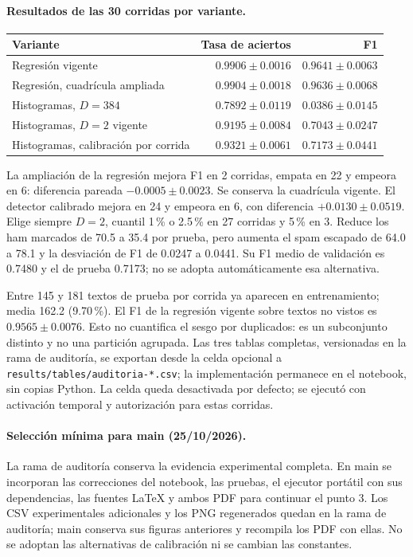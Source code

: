 \documentclass[11pt,letterpaper]{article}
\renewcommand{\_}{\originalunderscore\allowbreak}
\begin{document}
\paragraph{Resultados de las 30 corridas por variante.}
\begin{center}
\begin{tabular}{lrr}
\toprule
Variante & Tasa de aciertos & F1\\
\midrule
Regresión vigente & $0.9906\pm0.0016$ & $0.9641\pm0.0063$\\
Regresión, cuadrícula ampliada & $0.9904\pm0.0018$ & $0.9636\pm0.0068$\\
Histogramas, $D=384$ & $0.7892\pm0.0119$ & $0.0386\pm0.0145$\\
Histogramas, $D=2$ vigente & $0.9195\pm0.0084$ & $0.7043\pm0.0247$\\
Histogramas, calibración por corrida & $0.9321\pm0.0061$ & $0.7173\pm0.0441$\\
\bottomrule
\end{tabular}
\end{center}
La ampliación de la regresión mejora F1 en 2 corridas, empata en 22 y
empeora en 6: diferencia pareada $-0.0005\pm0.0023$. Se conserva la
cuadrícula vigente. El detector calibrado mejora en 24 y empeora en 6,
con diferencia $+0.0130\pm0.0519$. Elige siempre $D=2$, cuantil 1\,\% o
2.5\,\% en 27 corridas y 5\,\% en 3. Reduce los ham marcados de 70.5 a
35.4 por prueba, pero aumenta el spam escapado de 64.0 a 78.1 y la desviación
de F1 de 0.0247 a 0.0441. Su F1 medio de validación es 0.7480 y el de
prueba 0.7173; no se adopta automáticamente esa alternativa.

Entre 145 y 181 textos de prueba por corrida ya aparecen en entrenamiento;
media 162.2 (9.70\,\%). El F1 de la regresión vigente sobre textos no
vistos es $0.9565\pm0.0076$. Esto no cuantifica el sesgo por duplicados:
es un subconjunto distinto y no una partición agrupada.
Las tres tablas completas, versionadas en la rama de auditoría, se
exportan desde la celda opcional a \texttt{results/tables/auditoria-*.csv}; la implementación permanece en
el notebook, sin copias Python. La celda queda desactivada por defecto;
se ejecutó con activación temporal y autorización para estas corridas.

\paragraph{Selección mínima para main (25/10/2026).}
La rama de auditoría conserva la evidencia experimental completa. En main se incorporan las correcciones
del notebook, las pruebas, el ejecutor portátil con sus dependencias, las
fuentes LaTeX y ambos PDF para continuar el punto 3. Los CSV experimentales
adicionales y los PNG regenerados quedan en la rama de auditoría; main
conserva sus figuras anteriores y recompila los PDF con ellas. No se
adoptan las alternativas de calibración ni se cambian las constantes.
\end{document}
